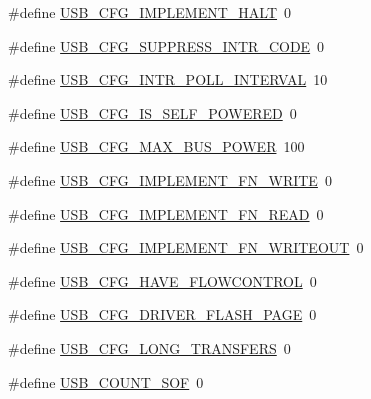 \begin{DoxyCompactItemize}
\#define \hyperlink{mhvlib-_vusb-_console_2vusb_2usbconfig_8h_af2a9b3ecff1707f1b6554a881a87b954}{U\-S\-B\-\_\-\-C\-F\-G\-\_\-\-I\-M\-P\-L\-E\-M\-E\-N\-T\-\_\-\-H\-A\-L\-T}~0
\item 
\#define \hyperlink{mhvlib-_vusb-_console_2vusb_2usbconfig_8h_a51ab4fa0f312f536ec6d4bc99a75c1b6}{U\-S\-B\-\_\-\-C\-F\-G\-\_\-\-S\-U\-P\-P\-R\-E\-S\-S\-\_\-\-I\-N\-T\-R\-\_\-\-C\-O\-D\-E}~0
\item 
\#define \hyperlink{mhvlib-_vusb-_console_2vusb_2usbconfig_8h_a9cccddfefa62f926a0d7bba9f183a4d3}{U\-S\-B\-\_\-\-C\-F\-G\-\_\-\-I\-N\-T\-R\-\_\-\-P\-O\-L\-L\-\_\-\-I\-N\-T\-E\-R\-V\-A\-L}~10
\item 
\#define \hyperlink{mhvlib-_vusb-_console_2vusb_2usbconfig_8h_ad5fd70b5fabd8abd34d5b9ef7100b709}{U\-S\-B\-\_\-\-C\-F\-G\-\_\-\-I\-S\-\_\-\-S\-E\-L\-F\-\_\-\-P\-O\-W\-E\-R\-E\-D}~0
\item 
\#define \hyperlink{mhvlib-_vusb-_console_2vusb_2usbconfig_8h_abe324d9b00dc186bcbac65ed0f94811c}{U\-S\-B\-\_\-\-C\-F\-G\-\_\-\-M\-A\-X\-\_\-\-B\-U\-S\-\_\-\-P\-O\-W\-E\-R}~100
\item 
\#define \hyperlink{mhvlib-_vusb-_console_2vusb_2usbconfig_8h_a7f117e204e14ff1028ada59f622173f2}{U\-S\-B\-\_\-\-C\-F\-G\-\_\-\-I\-M\-P\-L\-E\-M\-E\-N\-T\-\_\-\-F\-N\-\_\-\-W\-R\-I\-T\-E}~0
\item 
\#define \hyperlink{mhvlib-_vusb-_console_2vusb_2usbconfig_8h_a6be8d20f2d0eb0e87460b26681e60611}{U\-S\-B\-\_\-\-C\-F\-G\-\_\-\-I\-M\-P\-L\-E\-M\-E\-N\-T\-\_\-\-F\-N\-\_\-\-R\-E\-A\-D}~0
\item 
\#define \hyperlink{mhvlib-_vusb-_console_2vusb_2usbconfig_8h_afebecafb2986c559a5d346d601be9de3}{U\-S\-B\-\_\-\-C\-F\-G\-\_\-\-I\-M\-P\-L\-E\-M\-E\-N\-T\-\_\-\-F\-N\-\_\-\-W\-R\-I\-T\-E\-O\-U\-T}~0
\item 
\#define \hyperlink{mhvlib-_vusb-_console_2vusb_2usbconfig_8h_a5495a12e572cdaa8e11358f92d1b324f}{U\-S\-B\-\_\-\-C\-F\-G\-\_\-\-H\-A\-V\-E\-\_\-\-F\-L\-O\-W\-C\-O\-N\-T\-R\-O\-L}~0
\item 
\#define \hyperlink{mhvlib-_vusb-_console_2vusb_2usbconfig_8h_ac0335c6066303683807fc117e336e7c4}{U\-S\-B\-\_\-\-C\-F\-G\-\_\-\-D\-R\-I\-V\-E\-R\-\_\-\-F\-L\-A\-S\-H\-\_\-\-P\-A\-G\-E}~0
\item 
\#define \hyperlink{mhvlib-_vusb-_console_2vusb_2usbconfig_8h_a7a4d92baced8a64f4c150b9b59d20844}{U\-S\-B\-\_\-\-C\-F\-G\-\_\-\-L\-O\-N\-G\-\_\-\-T\-R\-A\-N\-S\-F\-E\-R\-S}~0
\item 
\#define \hyperlink{mhvlib-_vusb-_console_2vusb_2usbconfig_8h_a93e719c32f721d3e4b2dd5ba776da40b}{U\-S\-B\-\_\-\-C\-O\-U\-N\-T\-\_\-\-S\-O\-F}~0

\end{DoxyCompactItemize}
